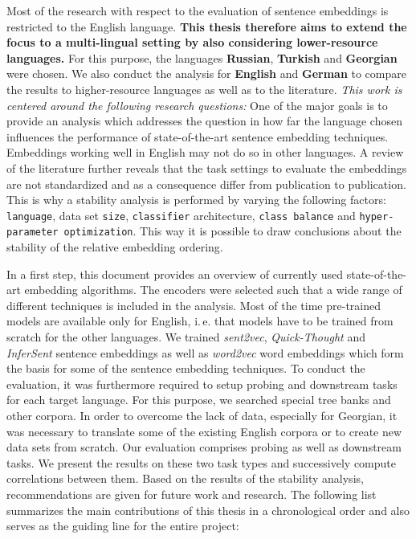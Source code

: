  Most of the research with respect to the evaluation of sentence embeddings is restricted to the English language.  \textbf{This thesis therefore aims to extend the focus to a multi-lingual setting by also considering lower-resource languages.} For this purpose, the languages \textbf{Russian}, \textbf{Turkish} and \textbf{Georgian} were chosen. We also conduct the analysis for \textbf{English} and \textbf{German} to compare the results to higher-resource languages as well as to the literature. \textit{This work is centered around the following research questions:}  One of the major goals is to provide an analysis which addresses the question in how far the language chosen influences the performance of state-of-the-art sentence embedding techniques. Embeddings working well in English may not do so in other languages.  A review of the literature further reveals that the task settings to evaluate the embeddings are not standardized and as a consequence differ from publication to publication. This is why a stability analysis is performed by varying the following factors: \texttt{language}, data set \texttt{size}, \texttt{classifier} architecture, \texttt{class balance} and \texttt{hyper-parameter optimization}. This way it is possible to draw conclusions about the stability of the relative embedding ordering.

 In a first step, this document provides an overview of currently used state-of-the-art embedding algorithms. The encoders were selected such that a wide range of different techniques is included in the analysis. Most of the time pre-trained models are available only for English, i.\,e. that models have to be trained from scratch for the other languages. We trained \textit{sent2vec}, \textit{Quick-Thought} and \textit{InferSent} sentence embeddings as well as \textit{word2vec} word embeddings which form the basis for some of the sentence embedding techniques. To conduct the evaluation, it was furthermore required to setup probing and downstream tasks for each target language. For this purpose, we searched special tree banks and other corpora. In order to overcome the lack of data, especially for Georgian, it was necessary to translate some of the existing English corpora or to create new data sets from scratch. Our evaluation comprises probing as well as downstream tasks. We present the results on these two task types and successively compute correlations between them. Based on the results of the stability analysis, recommendations are given for future work and research. The following list summarizes the main contributions of this thesis in a chronological order and also serves as the guiding line for the entire project:


